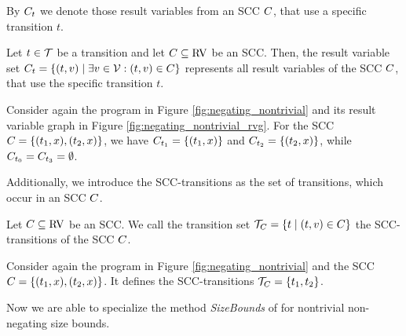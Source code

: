 By $C_t$ we denote those result variables from an SCC $C$, that use a specific transition $t$.

\begin{definition}
  Let $t \in \mathcal{T}$ be a transition and let $C \subseteq \text{RV}$ be an SCC.
  Then, the result variable set $C_t = \lbrace (t,v) \mid \exists v \in \mathcal{V} : (t,v) \in C \rbrace$ represents all result variables of the SCC $C$, that use the specific transition $t$.
\end{definition}

\begin{example}
  Consider again the program in Figure \ref{fig:negating_nontrivial} and its result variable graph in Figure \ref{fig:negating_nontrivial_rvg}.
  For the SCC $C = \lbrace (t_1,x), (t_2,x) \rbrace$, we have $C_{t_1} = \lbrace (t_1,x) \rbrace$ and $C_{t_2} = \lbrace (t_2,x) \rbrace$, while $C_{t_0} = C_{t_3} = \emptyset$.
\end{example}

Additionally, we introduce the SCC-transitions as the set of transitions, which occur in an SCC $C$.

\begin{definition}
  Let $C \subseteq \text{RV}$ be an SCC.
  We call the transition set $\mathcal{T}_C = \lbrace  t \mid (t,v) \in C \rbrace$ the SCC-transitions of the SCC $C$.
\end{definition}
  
\begin{example}
  Consider again the program in Figure \ref{fig:negating_nontrivial} and the SCC $C = \lbrace (t_1,x),(t_2,x) \rbrace$.
  It defines the SCC-transitions $\mathcal{T}_C = \lbrace t_1, t_2 \rbrace$.
\end{example}

Now we are able to specialize the method \emph{SizeBounds} of \cite{koat} for nontrivial non-negating size bounds.




